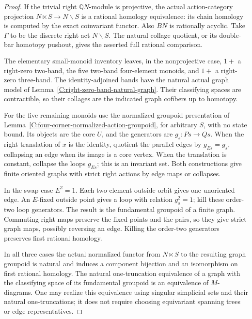 \begin{proof}
If the trivial right $\mathbb QN$-module is projective,
the actual action-category projection
$N\ltimes S\to N\backslash S$ is a rational homology
equivalence: its chain homology is computed by the exact
coinvariant functor.  Also $BN$ is rationally acyclic.
Take $\Gamma$ to be the discrete right act $N\backslash S$.
The natural collage quotient, or its double-bar homotopy
pushout, gives the asserted full rational comparison.

The elementary small-monoid inventory leaves, in the
nonprojective case, $1+$ a right-zero two-band, the five
two-band four-element monoids, and $1+$ a right-zero
three-band.  The identity-adjoined bands have the natural
actual graph model of
Lemma~\ref{C:right-zero-band-natural-graph}.  Their classifying
spaces are contractible, so their collages are the indicated
graph cofibers up to homotopy.

For the five remaining monoids use the normalized
groupoid presentation of
Lemma~\ref{C:four-corner-normalized-action-groupoid}, for
arbitrary $S$, with no state bound.  Its objects are the
core $U$, and the generators are $g_s:Ps\to Qs$.
When the right translation of $x$ is the identity, quotient
the parallel edges by $g_{Es}=g_s$, collapsing an edge when
its image is a core vertex.  When the translation is constant,
collapse the loops $g_{Es}$; this is an invariant set.
Both constructions give finite oriented graphs with strict
right actions by edge maps or collapses.

In the swap case $E^2=1$.  Each two-element outside orbit
gives one unoriented edge.  An $E$-fixed outside point gives
a loop with relation $g_s^2=1$; kill these order-two loop
generators.  The result is the fundamental groupoid of a
finite graph.  Commuting right maps preserve the fixed
points and the pairs, so they give strict graph maps,
possibly reversing an edge.  Killing the order-two
generators preserves first rational homology.

In all three cases the actual normalized functor from
$N\ltimes S$ to the resulting graph groupoid is natural
and induces a component bijection and an isomorphism on
first rational homology.  The natural one-truncation
equivalence of a graph with the classifying space of its
fundamental groupoid is an equivalence of $M$-diagrams.
One may realize this equivalence using singular simplicial
sets and their natural one-truncations; it does not require
choosing equivariant spanning trees or edge representatives.


\end{proof}
